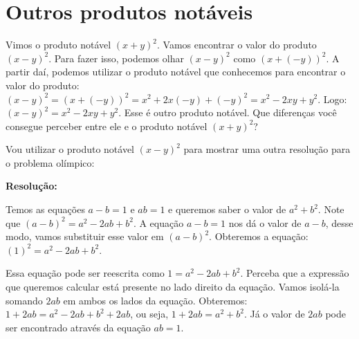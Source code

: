 \documentclass[a4paper, 12pt]{article}
\begin{document}
%


\section{Outros produtos notáveis}

\noindent Vimos o produto notável   \((x+y)^2\). Vamos encontrar o valor do produto \((x - y)^2\). Para fazer isso, podemos olhar \((x - y)^2\) como \((x + (-y))^2\). A partir daí, podemos utilizar o produto notável que conhecemos para encontrar o valor do produto:  \((x - y)^2 = (x + (-y))^2 = x^2 + 2x(-y) + (-y)^2 = x^2 - 2xy + y^2\). Logo: \((x - y)^2 = x^2 - 2xy + y^2\).  %
Esse é outro produto notável. Que diferenças você consegue perceber entre ele e o produto notável   \((x+y)^2\)? 


\noindent Vou utilizar o produto notável \((x-y)^2\) para mostrar uma outra resolução para o problema olímpico: 

\noindent \textbf{Resolução:}

\noindent Temos as equações   \(a - b = 1\) e   \(ab = 1\) e queremos saber o valor de \(a^2 + b^2\). %
Note que \((a-b)^2 = a^2 - 2ab + b^2\). A equação \(a - b = 1\) nos dá o valor de \(a - b\), desse modo, vamos substituir esse valor em   \((a-b)^2\). Obteremos a equação:   \((1)^2 = a^2 - 2ab + b^2\).  

\noindent Essa equação pode ser reescrita como  \(1 = a^2 - 2ab + b^2\). Perceba que a expressão que queremos calcular está presente no lado direito da equação. Vamos isolá-la somando \(2ab\) em ambos os lados da equação. Obteremos: \(1 + 2ab = a^2 - 2ab + b^2 + 2ab\), ou seja, \(1 + 2ab = a^2 + b^2\). Já o valor de \(2ab\) pode ser encontrado através da equação \(ab = 1\).
\end{document}
